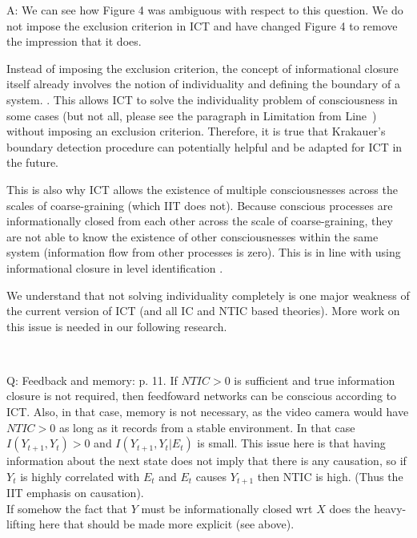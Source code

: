 \documentclass[utf8]{article}
\newcounter{cQuestion}[section]
\newenvironment{question}
    {\refstepcounter{cQuestion}\color{Blue}\noindent\newline Q\thecQuestion:}
    {~\newline}
\newenvironment{ans}  
    {\color{Black}\noindent A:}
    {~\newline}
\begin{document}
    	\begin{ans}
            We can see how Figure 4 was ambiguous with respect to this question. We do not impose the exclusion criterion in ICT and have changed Figure 4 to remove the impression that it does. 
            
            Instead of imposing the exclusion criterion, the concept of informational closure itself already involves the notion of individuality and defining the boundary of a system. \citep{BERTSCHINGER.2006}. This allows ICT to solve the individuality problem of consciousness in some cases (but not all, please see the paragraph in Limitation from Line~) without imposing an exclusion criterion. Therefore, it is true that Krakauer's boundary detection procedure can potentially helpful and be adapted for ICT in the future. 
            
            This is also why ICT allows the existence of multiple consciousnesses across the scales of coarse-graining (which IIT does not). Because conscious processes are informationally closed from each other across the scale of coarse-graining, they are not able to know the existence of other consciousnesses within the same system (information flow from other processes is zero). This is in line with using informational closure in level identification \citep{PFANTE.2014}.
            
            We understand that not solving individuality completely is one major weakness of the current version of ICT (and all IC and NTIC based theories). More work on this issue is needed in our following research.
            
            
    	\end{ans}

        \begin{question}
            Feedback and memory: p. 11. If $NTIC > 0$ is sufficient and true information closure is not required, then feedfoward networks can be conscious according to ICT. Also, in that case, memory is not necessary, as the video camera would have $NTIC > 0$ as long as it records from a stable environment. In that case $I(Y_{t+1}, Y_t) > 0$ and $I(Y_{t+1}, Y_t|E_t)$ is small. This issue here is that having information about the next state does not imply that there is any causation, so if $Y_t$ is highly correlated with $E_t$ and $E_t$ causes $Y_{t+1}$ then NTIC is high. (Thus the IIT emphasis on causation).\\
            If somehow the fact that $Y$ must be informationally closed wrt $X$ does the heavy-lifting here that should be made more explicit (see above).
        \end{question}
        
\end{document}
